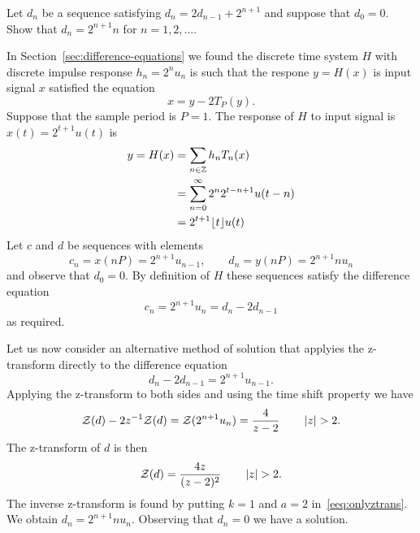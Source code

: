 \begin{excersizelist}
\item \label{exer:fftcomplexity} Let $d_n$ be a sequence satisfying $d_n = 2 d_{n-1} + 2^{n+1}$ and suppose that $d_0 = 0$.  Show that $d_n = 2^{n+1}n$ for $n = 1,2,\dots$.  %
\begin{solution}
In Section~\ref{sec:difference-equations} we found the discrete time system $H$ with discrete impulse response $h_n = 2^{n}u_n$ is such that the respone $y = H(x)$ is input signal $x$ satisfied the equation
\[
x = y - 2 T_{P}(y).
\] 
Suppose that the sample period is $P=1$.  The response of $H$ to input signal is $x(t) = 2^{t+1}u(t)$ is
\begin{align*}
y = H(x) &= \sum_{n \in {\mathbb Z}} h_n T_{n}(x) \\
&= \sum_{n = 0}^\infty 2^n 2^{t-n+1}u(t-n) \\
&= 2^{t+1} {\left\lfloor t \right\rfloor}u(t)
\end{align*}
Let $c$ and $d$ be sequences with elements 
\[
c_n = x(nP) = 2^{n+1}u_{n-1}, \qquad d_n = y(nP) = 2^{n+1}n u_n
\]
and observe that $d_0 = 0$.  By definition of $H$ these sequences satisfy the difference equation
\[
c_n = 2^{n+1}u_n = d_n - 2 d_{n-1}
\]
as required.

Let us now consider an alternative method of solution that applyies the z-transform directly to the difference equation
\[
 d_n - 2 d_{n-1} = 2^{n+1} u_{n-1}.
\]
Applying the z-transform to both sides and using the time shift property we have
\[
{\mathcal Z}(d) - 2 z^{-1} {\mathcal Z}(d) = {\mathcal Z}(2^{n+1} u_n) = \frac{4}{z-2} \qquad \left\vert z \right\vert > 2.
\]
The z-transform of $d$ is then
\[
{\mathcal Z}(d) = \frac{4z}{(z-2)^2} \qquad \left\vert z \right\vert > 2.
\]
The inverse z-transform is found by putting $k=1$ and $a = 2$ in~\eqref{eeq:onlyztrans}.  We obtain $d_n = 2^{n+1} n u_n$.  Observing that $d_n = 0$ we have a solution.
\end{solution}


\end{excersizelist}
